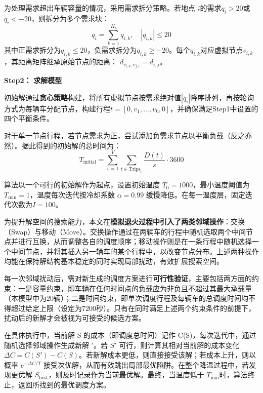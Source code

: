 \documentclass[withoutpreface,bwprint]{cumcmthesis}
\begin{document}
为处理需求超出车辆容量的情况，采用需求拆分策略。若地点 $i$的需求$q_i > 20$或$q_i < -20$，则拆分为多个需求块：
\begin{equation}
    q_i = \sum_{k=1}^{K_i} q_{i,k}, \quad |q_{i,k}| \leq 20
\end{equation}
其中正需求拆分为$q_{i,k} \leq 20$，负需求拆分为$q_{i,k} \geq -20$。每个$q_{i,k}$对应虚拟节点$v_{i,k}$，其距离矩阵继承原始节点的距离：
$d_{v_{i,k}, v_{j,l}} = d_{i,j}$。

\textbf{Step2：} \textbf{求解模型}

初始解通过\textbf{贪心策略}构建，将所有虚拟节点按需求绝对值$|q_i|$降序排列，再按轮询方式为每辆车分配节点，构建行程$ t = [0, v_1, \dots, v_k, 0]$，并确保满足Step1中设置的四个平衡条件。

对于单一节点行程，若节点需求为正，尝试添加负需求节点以平衡负载（反之亦然）。据此得到的初始解的总时间为：
\begin{equation}
    T_{\text{initial}} = \sum_{v=1}^{V} \sum_{t \in \text{Trips}_v} \frac{D(t)}{s} \cdot 3600
\end{equation}\par
算法以一个可行的初始解作为起点，设置初始温度 $T_0 = 1000$，最小温度阈值为$T_{\min} = 1$，温度每次迭代按冷却系数 $\alpha = 0.99$ 缓慢降低。在每一温度层，固定迭代次数为$I = 100$。

为提升解空间的搜索能力，本文在\textbf{模拟退火过程中引入了两类邻域操作}：交换（Swap）与移动（Move）。交换操作通过在两辆车的行程中随机选取两个中间节点并进行互换，从而调整各自的调度顺序；移动操作则是在一条行程中随机选择一个中间节点，并将其插入另一辆车的某个行程中，以改变节点分布。上述两种操作均能在保持解结构基本稳定的同时实现局部扰动，有效扩展搜索空间。

每一次邻域扰动后，需对新生成的调度方案进行\textbf{可行性验证}，主要包括两方面的约束：一是容量约束，即车辆在任何时间点的负载应为非负且不超过其最大承载量（本模型中为20辆）；二是时间约束，即单次调度行程及每辆车的总调度时间均不得超过给定上限（设定为7200秒）。只有在同时满足上述两个约束条件的前提下，扰动后的新解才会被视为可接受的候选方案。

在具体执行中，当前解 S 的成本（即调度总时间）记作 C(S)，每次迭代中，通过随机选择邻域操作生成新解 ${\prime}$。若 $S{\prime}$ 可行，则计算其相对当前解的成本变化 $\Delta C = C(S{\prime}) - C(S)$。若新解成本更低，则直接接受该解；若成本上升，则以概率 $e^{-\Delta C / T}$ 接受次优解，从而有效跳出局部最优陷阱。在整个降温过程中，若发现更优解 $S_{\text{best}}$，则及时记录作为当前最优解。最终，当温度低于 $T_{\min} $时，算法终止，返回所找到的最优调度方案。
\end{document}
